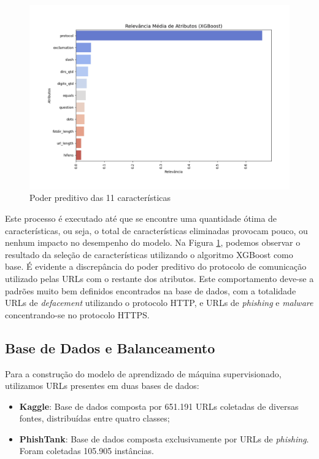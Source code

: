 \documentclass[manuscript,screen,review]{acmart}
\begin{document}
\vspace*{-1cm}
\begin{figure}[ht]
    \centering
    \includegraphics[width=1\textwidth]{pic/attr.pdf}
    \vspace*{-1cm}
    \caption{Poder preditivo das 11 características}
    \label{fig:exampleFig1}
\end{figure}

Este processo é executado até que se encontre uma quantidade ótima de características, ou seja, o total de características eliminadas provocam pouco, ou nenhum impacto no desempenho do modelo. Na Figura \ref{fig:exampleFig1}, podemos observar o resultado da seleção de características utilizando o algoritmo XGBoost \cite{10.1145/2939672.2939785} como base. É evidente a discrepância do poder preditivo do protocolo de comunicação utilizado pelas URLs com o restante dos atributos. Este comportamento deve-se a padrões muito bem definidos encontrados na base de dados, com a totalidade URLs de \emph{defacement} utilizando o protocolo HTTP, e URLs de \emph{phishing} e \emph{malware} concentrando-se no protocolo HTTPS.

\subsection{Base de Dados e Balanceamento}

Para a construção do modelo de aprendizado de máquina supervisionado, utilizamos URLs presentes em duas bases de dados:

\begin{itemize}
    \setlength{\itemsep}{10pt}
    \item \textbf{Kaggle}\footnotemark: Base de dados composta por 651.191 URLs coletadas de diversas fontes, distribuídas entre quatro classes;
    \item \textbf{PhishTank}\footnotemark: Base de dados composta exclusivamente por URLs de \emph{phishing}. Foram coletadas 105.905 instâncias. 
\end{itemize}
\end{document}
